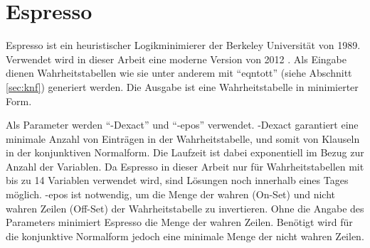 \section{Espresso}
\label{sec:espresso}

Espresso ist ein heuristischer Logikminimierer der Berkeley Universität von 1989. Verwendet wird in dieser
Arbeit eine moderne Version von 2012 \cite{espressobin}. Als Eingabe dienen Wahrheitstabellen wie sie
unter anderem mit "`eqntott"' (siehe Abschnitt \ref{sec:knf}) generiert werden. Die Ausgabe ist eine
Wahrheitstabelle in minimierter Form.

Als Parameter werden "`-Dexact"' und "`-epos"' verwendet. -Dexact garantiert eine minimale Anzahl von
Einträgen in der Wahrheitstabelle, und somit von Klauseln in der konjunktiven Normalform. Die Laufzeit
ist dabei exponentiell im Bezug zur Anzahl der Variablen. Da Espresso in dieser Arbeit nur für
Wahrheitstabellen mit bis zu 14 Variablen verwendet wird, sind Lösungen noch innerhalb eines Tages möglich.
-epos ist notwendig, um die Menge der wahren (On-Set) und nicht wahren Zeilen (Off-Set) der Wahrheitstabelle
zu invertieren. Ohne die Angabe des Parameters minimiert Espresso die Menge der wahren Zeilen. Benötigt
wird für die konjunktive Normalform jedoch eine minimale Menge der nicht wahren Zeilen.